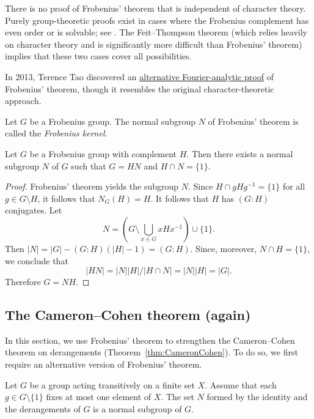 There is no proof of Frobenius’ theorem that is  independent of character theory. Purely group-theoretic proofs exist in cases where the Frobenius complement has even order or is solvable; see
\cite[Remark 16.2]{MR1645304}. The Feit--Thompson theorem (which relies heavily on character theory and is significantly more difficult than Frobenius’ theorem) implies that these two cases cover all possibilities. 

In 2013, Terence Tao discovered an \href{https://terrytao.wordpress.com/2013/05/24/a-fourier-analytic-proof-of-frobeniuss-theorem/}{alternative 
Fourier-analytic
proof} of Frobenius’ theorem, though it resembles the original character-theoretic approach.

\begin{definition}
  Let $G$ be a Frobenius group. The normal subgroup 
  $N$ of Frobenius' theorem is called the \emph{Frobenius kernel}. 
\end{definition}

\begin{corollary}
  Let $G$ be a Frobenius group with complement $H$. 
  Then there exists a normal subgroup $N$ of $G$ 
  such that 
  $G=HN$ and $H\cap N=\{1\}$.
\end{corollary}

\begin{proof}
  Frobenius' theorem yields the subgroup $N$. Since 
  $H\cap gHg^{-1}=\{1\}$ for all $g\in G\setminus H$, 
  it follows that 
  $N_G(H)=H$. It follows that $H$
  has $(G:H)$ conjugates. 
  Let 
  \[
  N=\left( G\setminus\bigcup_{x\in G}xHx^{-1}\right)\cup\{1\}.
  \]
  Then  
  $|N|=|G|-(G:H)(|H|-1)=(G:H)$.
  Since, moreover, $N\cap H=\{1\}$, we conclude that
  \[
  |HN|=|N||H|/|H\cap N|=|N||H|=|G|.
  \]
  Therefore $G=NH$.
\end{proof}

\subsection{The Cameron--Cohen theorem (again)}

In this section, we use Frobenius’ theorem to strengthen the Cameron--Cohen theorem on derangements (Theorem~\ref{thm:CameronCohen}). To do so, we first require an alternative version of Frobenius’ theorem.

\begin{corollary}[Frobenius]
    \label{cor:Frobenius_combinatorio}
    Let $G$ be a group acting transitively on a finite set $X$. 
    Assume that each $g\in G\setminus\{1\}$ fixes 
    at most one element of 
     $X$. The set $N$ formed by the identity and the derangements 
     of $G$ is a normal subgroup of $G$.
\end{corollary}

